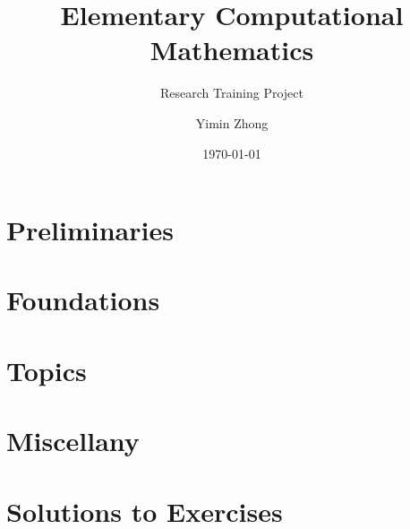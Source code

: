 \documentclass[12pt,a4paper,final]{book}
\title{Elementary Computational Mathematics}
\subtitle{Research Training Project}
\author{Yimin Zhong}
\date{\today}
\begin{document}
\maketitle
\frontmatter

\tableofcontents
\mainmatter
\part{Preliminaries}









\part{Foundations}

\part{Topics}

\part{Miscellany}

\part{Solutions to Exercises}

\end{document}
